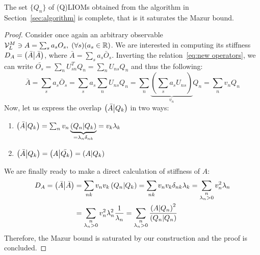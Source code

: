 \begin{proposition}
  The set \(\{Q_n\}\) of (Q)LIOMs obtained from the algorithm in Section~\ref{sec:algorithm} is complete,
  that is it saturates the Mazur bound. 
\label{prop:saturation}
\end{proposition}
\begin{proof}
  Consider once again an arbitrary observable \(\mathcal{V}_L^M \ni A = \sum_s a_s O_s,\; 
  (\forall s) (a_s \in \mathbb{R})\). We are interested in computing its stiffness \(D_A = \left(\bar{A} \middle| \bar{A}\right)\), 
  where \(\bar{A} = \sum_s a_s \bar{O}_s\). Inverting the relation~\eqref{eq:new operators}, we can write 
  \(\bar{O_s} = \sum_n U_{sn}^T Q_n = \sum_n U_{ns} Q_n\) and thus the following:
  \begin{equation*}
    \bar{A} = \sum_s a_s \bar{O}_s = \sum_s a_s \sum_n U_{ns} Q_n =
    \sum_n \underbrace{\left(\sum_s a_s U_{ns}\right)}_{v_n} Q_n = \sum_n v_n Q_n
  \end{equation*}
  Now, let us express the overlap \(\left(\bar{A} \middle| Q_k\right)\) in two ways:
  \begin{enumerate}
    \item \(\left(\bar{A} \middle| Q_k\right) = \sum_n v_n \underbrace{\left(Q_n \middle| Q_k\right)}_{=\lambda_n \delta_{nk}} = v_k \lambda_k\)
    \item \(\left(\bar{A} \middle| Q_k\right) = \left(A \middle| \bar{Q_k}\right) = \left(A \middle| Q_k\right)\)
  \end{enumerate}
  We are finally ready to make a direct calculation of stiffness of \(A\):
  \begin{align*}
    D_A = \left(\bar{A} \middle| \bar{A}\right) &= \sum_{nk} v_n v_k \left(Q_n \middle| Q_k\right) = \sum_{nk} v_n v_k \delta_{nk} \lambda_{k} = 
    \sum_{\substack{n\\\lambda_n > 0}} v_n^2 \lambda_n \\
    &= \sum_{\substack{n\\\lambda_n > 0}} v_n^2 \lambda_n^2 \frac{1}{\lambda_n} = 
    \sum_{\substack{n\\\lambda_n > 0}} \frac{\left(A \middle| Q_n\right)^2}{\left(Q_n \middle| Q_n\right)}
  \end{align*}
  Therefore, the Mazur bound is saturated by our construction and the proof is concluded.
\end{proof}

